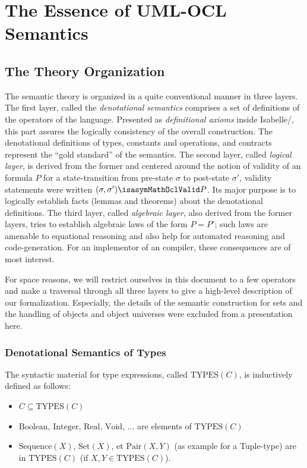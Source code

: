\section{The Essence of UML-OCL Semantics}
\subsection{The Theory Organization}
The semantic theory is organized in a quite conventional manner in
three layers. The first layer, called the \emph{denotational
  semantics} comprises a set of definitions of the operators of the
language.  Presented as \emph{definitional axioms} inside
Isabelle/\HOL, this part assures the logically consistency of the
overall construction. The denotational definitions of types, constants
and operations, and \OCL contracts represent the ``gold standard'' of the
semantics. The second layer, called \emph{logical layer},
is derived from the former and centered around the notion of validity
of an \OCL formula $P$ for a state-transition from pre-state $\sigma$
to post-state $\sigma'$, validity statements were written $(\sigma,
\sigma') \isasymMathOclValid P$. Its major purpose is to logically establish facts
(lemmas and theorems) about the denotational definitions.
The third layer, called \emph{algebraic layer},
also derived from the former layers, tries to establish algebraic laws
of the form $P = P'$; such laws are amenable to equational reasoning
and also help for automated reasoning and code-generation. For an
implementor of an \OCL compiler, these consequences are of most interest.

For space reasons, we will restrict ourselves in this document to a few
operators and make a traversal through all three layers to give a
high-level description of our formalization.  Especially, the details
of the semantic construction for sets and the handling of objects and
object universes were excluded from a presentation here.

\subsubsection{Denotational Semantics of Types}
The syntactic material for type expressions, called $\text{TYPES}(C)$, is inductively
defined as follows: 
\begin{itemize}
\item $C \subseteq \text{TYPES}(C)$ 
\item $\text{Boolean}$, $\text{Integer}$, $\text{Real}$, $\text{Void}$, ... are elements
      of $\text{TYPES}(C)$
\item $\text{Sequence}(X)$, $\text{Set}(X)$, et $\text{Pair}(X,Y)$ (as example for a Tuple-type)
      are in  $\text{TYPES}(C)$ (if $X, Y \in \text{TYPES}(C)$).
\end{itemize}

